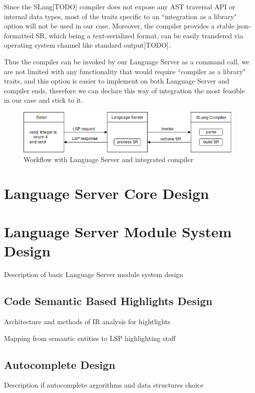 Since the SLang[TODO] compiler does not expose any AST traversal API or internal data types, most of 
the traits specific to an ``integration as a library" option will not be used in our case.
Moreover, the compiler provides a stable json-formatted SR, which being a text-serialized format, 
can be easily transfered via operating system channel like standard output[TODO].

Thus the compiler can be invoked by our Language Server as a command call, we are not limited 
with any functionality that would require ``compiler as a library" traits, and this option
is easier to implement on both Language Server and compiler ends,
therefore we can declare this way of integration the most feasible in our case and stick to it.

\begin{figure}[H]
    \centering
    \includegraphics[width=1.0\textwidth]{figs/compiler_integration.png}
    \caption{Workflow with Language Server and integrated compiler}
\end{figure}


\section{Language Server Core Design}
\label{sec:met:ls_design}

\section{Language Server Module System Design}
\label{sec:met:ls_mod}
Description of basic Language Server module system design

\subsection{Code Semantic Based Highlights Design}
\label{sec:met:ls_mod:semhighlight}
Architecture and methods of IR analysis for hightlights

Mapping from semantic entities to LSP highlighting staff

\subsection{Autocomplete Design}
\label{sec:impl:ls_mod:autocomplete}
Description if autocomplete argorithms and data structures choice